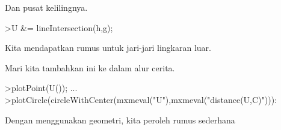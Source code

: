 \documentclass[a4paper,10pt]{article}
\begin{document}
\begin{eulernotebook}
\begin{eulercomment}
\begin{eulercomment}
\begin{eulercomment}
\begin{eulercomment}
\begin{eulercomment}
\begin{eulercomment}
\begin{eulercomment}
\begin{eulercomment}
\begin{eulercomment}
\begin{eulercomment}
\begin{eulercomment}
\begin{eulercomment}
\begin{eulercomment}
\begin{eulercomment}
\begin{eulercomment}
\begin{eulercomment}
\begin{eulercomment}
\begin{eulercomment}
\begin{eulercomment}
\begin{eulercomment}
\begin{eulercomment}
\begin{eulercomment}
\begin{eulercomment}
\begin{eulercomment}
\begin{eulercomment}
\begin{eulercomment}
\begin{eulercomment}
\begin{eulercomment}
\begin{eulercomment}
\begin{eulercomment}
\begin{eulerprompt}
\end{eulerprompt}
\begin{eulercomment}
Dan pusat kelilingnya.
\end{eulercomment}
\begin{eulerprompt}
>U &= lineIntersection(h,g);
\end{eulerprompt}
\begin{eulercomment}
Kita mendapatkan rumus untuk jari-jari lingkaran luar.
\end{eulercomment}
\begin{eulercomment}
Mari kita tambahkan ini ke dalam alur cerita.
\end{eulercomment}
\begin{eulerprompt}
>plotPoint(U()); ...
>plotCircle(circleWithCenter(mxmeval("U"),mxmeval("distance(U,C)"))):
\end{eulerprompt}
\begin{eulercomment}
Dengan menggunakan geometri, kita peroleh rumus sederhana


\end{eulercomment}
\end{eulercomment}
\end{eulercomment}
\end{eulercomment}
\end{eulercomment}
\end{eulercomment}
\end{eulercomment}
\end{eulercomment}
\end{eulercomment}
\end{eulercomment}
\end{eulercomment}
\end{eulercomment}
\end{eulercomment}
\end{eulercomment}
\end{eulercomment}
\end{eulercomment}
\end{eulercomment}
\end{eulercomment}
\end{eulercomment}
\end{eulercomment}
\end{eulercomment}
\end{eulercomment}
\end{eulercomment}
\end{eulercomment}
\end{eulercomment}
\end{eulercomment}
\end{eulercomment}
\end{eulercomment}
\end{eulercomment}
\end{eulercomment}
\end{eulercomment}
\end{eulernotebook}
\end{document}
